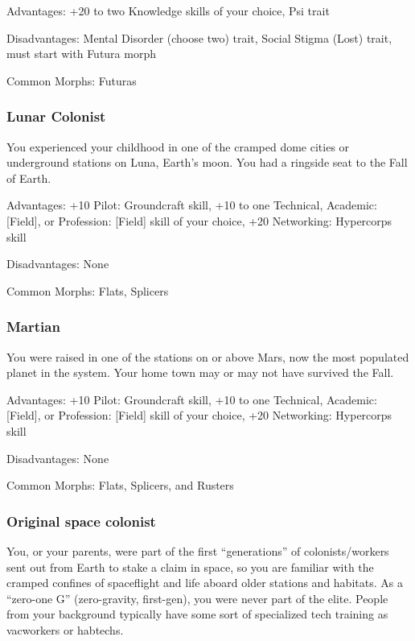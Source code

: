 Advantages: +20 to two Knowledge skills of your choice, Psi trait 

Disadvantages: Mental Disorder (choose two) trait, Social Stigma (Lost) trait, must start with Futura morph

Common Morphs: Futuras

\subsubsection{Lunar Colonist}
\label{sec:lunar-colonist}

You experienced your childhood in one of the cramped dome cities or underground stations on Luna, Earth’s moon. You had a ringside seat to the Fall of Earth.

Advantages: +10 Pilot: Groundcraft skill, +10 to one Technical, Academic: [Field], or Profession: [Field] skill of your choice, +20 Networking: Hypercorps skill

Disadvantages: None

Common Morphs: Flats, Splicers


\subsubsection{Martian} %
\label{sec:martian}

You were raised in one of the stations on or above Mars, now the most populated planet in the system. Your home town may or may not have survived the Fall. 

Advantages: +10 Pilot: Groundcraft skill, +10 to one Technical, Academic: [Field], or Profession: [Field] skill of your choice, +20 Networking: Hypercorps skill 

Disadvantages: None

Common Morphs: Flats, Splicers, and Rusters

\subsubsection{Original space colonist} %
\label{sec:original-space-colonist}

You, or your parents, were part of the first “generations” of colonists/workers sent out from Earth to stake a claim in space, so you are familiar with the cramped confines of spaceflight and life aboard older stations and habitats. As a “zero-one G” (zero-gravity, first-gen), you were never part of the elite. People from your background typically have some sort of specialized tech training as vacworkers or habtechs.

